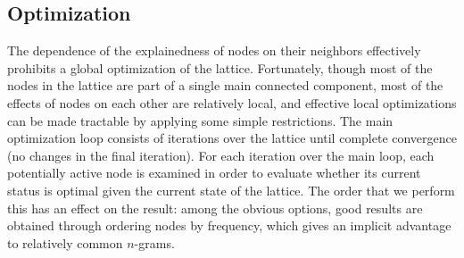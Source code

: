 \documentclass[11pt,letterpaper]{article}
\newcommand{\minLPR}{\ensuremath{\text{minLPR}}}
\begin{document}




 
\subsection{Optimization}

The dependence of the explainedness of nodes on their neighbors effectively prohibits a global optimization of the lattice. Fortunately, though most of the nodes in the lattice are part of a single main connected component, most of the effects of nodes on each other are relatively local, and effective local optimizations can be made tractable by applying some simple restrictions. The main optimization loop consists of iterations over the lattice until complete convergence (no changes in the final iteration). For each iteration over the main loop, each potentially active node is examined in order to evaluate whether its current status is optimal given the current state of the lattice. The order that we perform this has an effect on the result: among the obvious options, good results are obtained through ordering nodes by frequency, which gives an implicit advantage to relatively common $n$-grams.
\end{document}
